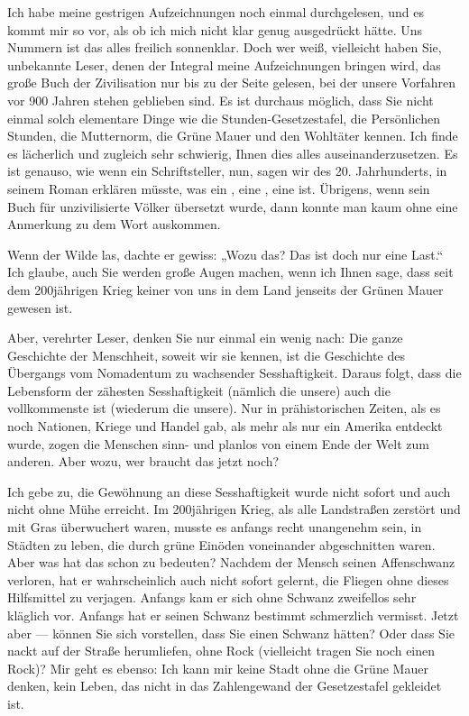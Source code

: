 Ich habe meine gestrigen Aufzeichnungen noch einmal durchgelesen,
und es kommt mir so vor, als ob ich mich nicht klar genug
ausgedrückt hätte. Uns Nummern ist das alles freilich sonnenklar.
Doch wer weiß, vielleicht haben Sie, unbekannte Leser, denen der
Integral meine Aufzeichnungen bringen wird, das große Buch der
Zivilisation nur bis zu der Seite gelesen, bei der unsere Vorfahren
vor 900 Jahren stehen geblieben sind. Es ist durchaus möglich, dass
Sie nicht einmal solch elementare Dinge wie die
Stunden-Gesetzestafel, die Persönlichen Stunden, die Mutternorm,
die Grüne Mauer und den Wohltäter kennen. Ich finde es lächerlich
und zugleich sehr schwierig, Ihnen dies alles auseinanderzusetzen.
Es ist genauso, wie wenn ein Schriftsteller, nun, sagen wir des 20.
Jahrhunderts, in seinem Roman erklären müsste, was ein , eine
, eine  ist. Übrigens, wenn
sein Buch für unzivilisierte Völker übersetzt wurde, dann konnte
man kaum ohne eine Anmerkung zu dem Wort  auskommen.

Wenn der Wilde  las, dachte er gewiss: „Wozu das? Das ist doch
nur eine Last.“ Ich glaube, auch Sie werden große Augen machen,
wenn ich Ihnen sage, dass seit dem 200jährigen Krieg keiner von uns
in dem Land jenseits der Grünen Mauer gewesen ist.

Aber, verehrter Leser, denken Sie nur einmal ein wenig nach: Die
ganze Geschichte der Menschheit, soweit wir sie kennen, ist die
Geschichte des Übergangs vom Nomadentum zu wachsender
Sesshaftigkeit. Daraus folgt, dass die Lebensform der zähesten
Sesshaftigkeit (nämlich die unsere) auch die vollkommenste ist
(wiederum die unsere). Nur in prähistorischen Zeiten, als es noch
Nationen, Kriege und Handel gab, als mehr als nur ein Amerika
entdeckt wurde, zogen die Menschen sinn- und planlos von einem Ende
der Welt zum anderen. Aber wozu, wer braucht das jetzt noch?

Ich gebe zu, die Gewöhnung an diese Sesshaftigkeit wurde nicht
sofort und auch nicht ohne Mühe erreicht. Im 200jährigen Krieg, als
alle Landstraßen zerstört und mit Gras überwuchert waren, musste es
anfangs recht unangenehm sein, in Städten zu leben, die durch grüne
Einöden voneinander abgeschnitten waren. Aber was hat das schon zu
bedeuten? Nachdem der Mensch seinen Affenschwanz verloren, hat er
wahrscheinlich auch nicht sofort gelernt, die Fliegen ohne dieses
Hilfsmittel zu verjagen. Anfangs kam er sich ohne Schwanz
zweifellos sehr kläglich vor. Anfangs hat er seinen Schwanz
bestimmt schmerzlich vermisst. Jetzt aber — können Sie sich
vorstellen, dass Sie einen Schwanz hätten? Oder dass Sie nackt auf
der Straße herumliefen, ohne Rock (vielleicht
tragen Sie noch einen Rock)? Mir geht es ebenso: Ich kann mir
keine Stadt ohne die Grüne Mauer denken, kein Leben, das nicht in
das Zahlengewand der Gesetzestafel gekleidet ist.

